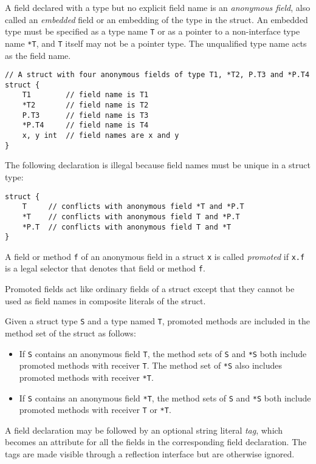 A field declared with a type but no explicit field name is an
\emph{anonymous field}, also called an \emph{embedded} field or an
embedding of the type in the struct. An embedded type must be specified
as a type name \texttt{T} or as a pointer to a non-interface type name
\texttt{*T}, and \texttt{T} itself may not be a pointer type. The
unqualified type name acts as the field name.

\begin{Verbatim}[frame=single]
// A struct with four anonymous fields of type T1, *T2, P.T3 and *P.T4
struct {
    T1        // field name is T1
    *T2       // field name is T2
    P.T3      // field name is T3
    *P.T4     // field name is T4
    x, y int  // field names are x and y
}
\end{Verbatim}

The following declaration is illegal because field names must be unique
in a struct type:

\begin{Verbatim}[frame=single]
struct {
    T     // conflicts with anonymous field *T and *P.T
    *T    // conflicts with anonymous field T and *P.T
    *P.T  // conflicts with anonymous field T and *T
}
\end{Verbatim}

A field or method \texttt{f} of an
anonymous field in a struct \texttt{x} is called \emph{promoted} if
\texttt{x.f} is a legal selector that denotes that
field or method \texttt{f}.

Promoted fields act like ordinary fields of a struct except that they
cannot be used as field names in
composite literals of the struct.

Given a struct type \texttt{S} and a type named \texttt{T}, promoted
methods are included in the method set of the struct as follows:

\begin{itemize}
\item
  If \texttt{S} contains an anonymous field \texttt{T}, the
  method sets of \texttt{S} and \texttt{*S}
  both include promoted methods with receiver \texttt{T}. The method set
  of \texttt{*S} also includes promoted methods with receiver
  \texttt{*T}.
\item
  If \texttt{S} contains an anonymous field \texttt{*T}, the method sets
  of \texttt{S} and \texttt{*S} both include promoted methods with
  receiver \texttt{T} or \texttt{*T}.
\end{itemize}

A field declaration may be followed by an optional string literal
\emph{tag}, which becomes an attribute for all the fields in the
corresponding field declaration. The tags are made visible through a
reflection interface but are otherwise
ignored.

